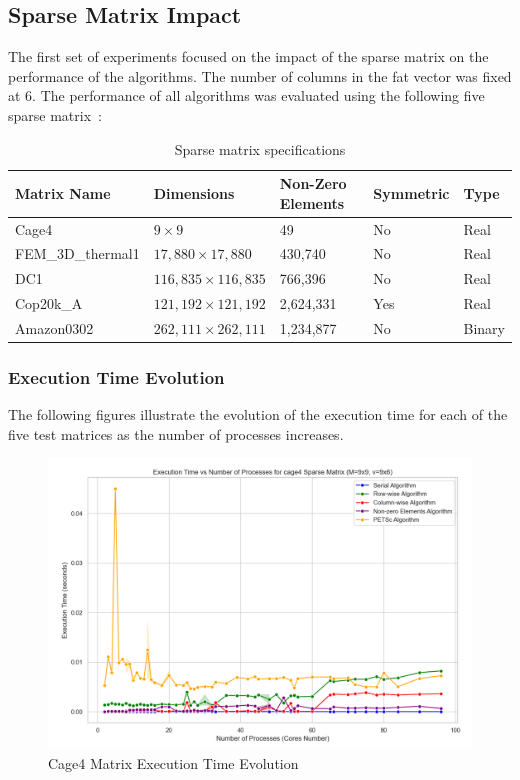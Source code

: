 \documentclass[12pt,oneside]{book} %
\begin{document}
\subsection{Sparse Matrix Impact}
The first set of experiments focused on the impact of the sparse matrix on the
performance of the algorithms. The number of columns in the fat vector was
fixed at 6. The performance of all algorithms was evaluated using the following
five sparse matrix~\cite{Lugowski2023FastMatrixMarket,
    Kolodziej2019SuiteSparseInterface}:
\begin{table}[h]
    \centering
    \begin{tabular}{|l|l|l|l|l|}
        \hline
        \textbf{Matrix Name} & \textbf{Dimensions}        & \textbf{Non-Zero Elements} & \textbf{Symmetric} & \textbf{Type} \\ \hline
        Cage4                & \(9 \times 9\)             & 49                         & No                 & Real          \\ \hline
        FEM\_3D\_thermal1    & \(17,880 \times 17,880\)   & 430,740                    & No                 & Real          \\ \hline
        DC1                  & \(116,835 \times 116,835\) & 766,396                    & No                 & Real          \\ \hline
        Cop20k\_A            & \(121,192 \times 121,192\) & 2,624,331                  & Yes                & Real          \\ \hline
        Amazon0302           & \(262,111 \times 262,111\) & 1,234,877                  & No                 & Binary        \\ \hline
    \end{tabular}
    \caption{Sparse matrix specifications}
    \label{tab:matrix_summary}
\end{table}

\newpage
\subsubsection{Execution Time Evolution}
The following figures illustrate the evolution of the execution time for each
of the five test matrices as the number of processes increases.

\begin{figure}[H]
    \centering
    \includegraphics[width=0.6\linewidth]{../results/matrix_dim/cage4_k6_execution_time.png}
    \caption{Cage4 Matrix Execution Time Evolution}\label{fig:cage4-k6-execution-time}
\end{figure}
\end{document}
